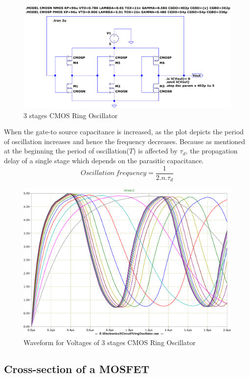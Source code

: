 \documentclass[a4paper,11pt]{article}%
\begin{document}
\begin{figure}[H]
	\centering
	\includegraphics[scale=0.6]{figures/cct1plot1}
	\caption{3 stages CMOS Ring Oscillator}
\end{figure}
\pagebreak
When the gate-to source  capacitance is increased, as the plot depicts the period of oscillation increases and hence the frequency decreases. Because as mentioned at the beginning the period of oscillation($T$) is affected by $\tau_{d}$, the propagation delay of a single stage which depends on the parasitic capacitance.
\[
Oscillation~frequency = \frac{1}{2.n.\tau_{d}}
\]

\begin{figure}[H]
	\centering
	\includegraphics[scale=0.5]{figures/cct1plot2}
	\caption{Waveform for Voltages of 3 stages CMOS Ring Oscillator}
\end{figure}

\subsection{Cross-section of a MOSFET}
\end{document}
